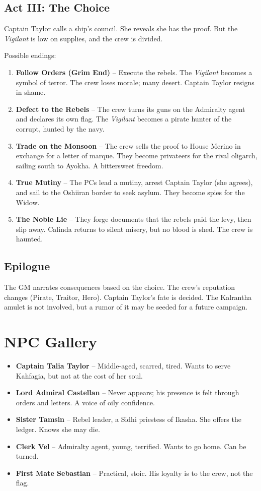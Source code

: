 \documentclass[11pt]{article}
\begin{document}
\subsection{Act III: The Choice}
Captain Taylor calls a ship's council. She reveals she has the proof. But the \textit{Vigilant} is low on supplies, and the crew is divided.

Possible endings:

\begin{enumerate}
    \item \textbf{Follow Orders (Grim End)} -- Execute the rebels. The \textit{Vigilant} becomes a symbol of terror. The crew loses morale; many desert. Captain Taylor resigns in shame.
    \item \textbf{Defect to the Rebels} -- The crew turns its guns on the Admiralty agent and declares its own flag. The \textit{Vigilant} becomes a pirate hunter of the corrupt, hunted by the navy.
    \item \textbf{Trade on the Monsoon} -- The crew sells the proof to House Merino in exchange for a letter of marque. They become privateers for the rival oligarch, sailing south to Ayokha. A bittersweet freedom.
    \item \textbf{True Mutiny} -- The PCs lead a mutiny, arrest Captain Taylor (she agrees), and sail to the Oshiiran border to seek asylum. They become spies for the Widow.
    \item \textbf{The Noble Lie} -- They forge documents that the rebels paid the levy, then slip away. Calinda returns to silent misery, but no blood is shed. The crew is haunted.
\end{enumerate}

\subsection{Epilogue}
The GM narrates consequences based on the choice. The crew's reputation changes (Pirate, Traitor, Hero). Captain Taylor's fate is decided. The Kalrantha amulet is not involved, but a rumor of it may be seeded for a future campaign.

\section{NPC Gallery}

\begin{itemize}
    \item \textbf{Captain Talia Taylor} -- Middle-aged, scarred, tired. Wants to serve Kahfagia, but not at the cost of her soul.
    \item \textbf{Lord Admiral Castellan} -- Never appears; his presence is felt through orders and letters. A voice of oily confidence.
    \item \textbf{Sister Tamsin} -- Rebel leader, a Sidhi priestess of Ikasha. She offers the ledger. Knows she may die.
    \item \textbf{Clerk Vel} -- Admiralty agent, young, terrified. Wants to go home. Can be turned.
    \item \textbf{First Mate Sebastian} -- Practical, stoic. His loyalty is to the crew, not the flag.
\end{itemize}
\end{document}
